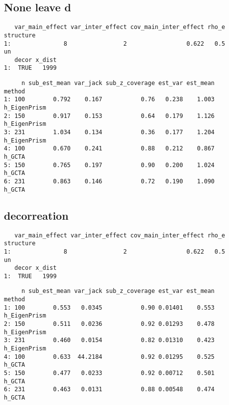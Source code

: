 \documentclass[]{article}
\begin{document}
\subsection{None leave d}\label{none-leave-d}

\begin{verbatim}
   var_main_effect var_inter_effect cov_main_inter_effect rho_e structure
1:               8                2                 0.622   0.5        un
   decor x_dist
1:  TRUE   1999
\end{verbatim}

\begin{verbatim}
     n sub_est_mean var_jack sub_z_coverage est_var est_mean       method
1: 100        0.792    0.167           0.76   0.238    1.003 h_EigenPrism
2: 150        0.917    0.153           0.64   0.179    1.126 h_EigenPrism
3: 231        1.034    0.134           0.36   0.177    1.204 h_EigenPrism
4: 100        0.670    0.241           0.88   0.212    0.867       h_GCTA
5: 150        0.765    0.197           0.90   0.200    1.024       h_GCTA
6: 231        0.863    0.146           0.72   0.190    1.090       h_GCTA
\end{verbatim}

\subsection{decorreation}\label{decorreation-1}

\begin{verbatim}
   var_main_effect var_inter_effect cov_main_inter_effect rho_e structure
1:               8                2                 0.622   0.5        un
   decor x_dist
1:  TRUE   1999
\end{verbatim}

\begin{verbatim}
     n sub_est_mean var_jack sub_z_coverage est_var est_mean       method
1: 100        0.553   0.0345           0.90 0.01401    0.553 h_EigenPrism
2: 150        0.511   0.0236           0.92 0.01293    0.478 h_EigenPrism
3: 231        0.460   0.0154           0.82 0.01310    0.423 h_EigenPrism
4: 100        0.633  44.2184           0.92 0.01295    0.525       h_GCTA
5: 150        0.477   0.0233           0.92 0.00712    0.501       h_GCTA
6: 231        0.463   0.0131           0.88 0.00548    0.474       h_GCTA
\end{verbatim}
\end{document}
